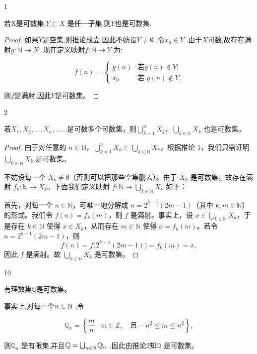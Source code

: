 \begin{mycor*}{1}

若X是可数集,\(Y \subset X\) 是任一子集,则$Y$也是可数集.

\end{mycor*}

\begin{proof}

如果$Y$是空集,则推论成立.因此不妨设\(Y \neq \emptyset\) .令\(x_0 \in Y\) .由于$X$可数,故存在满射\(g: \mathbb{N} \rightarrow X\) .现在定义映射\(f: \mathbb{N} \rightarrow Y\) 为:

\[
f(n) = 
	\begin{cases} 
	g(n) & \text{若}g(n) \in Y; \\ 
	x_0 \quad &\text{若 }g(n) \notin Y. 
	\end{cases}
\]

则$f$是满射,因此$Y$是可数集。

\end{proof}

\begin{mycor*}{2}

若$X_1 ,X_2 , \ldots,X_n , \ldots\ldots$是可数多个可数集，则\(\bigcup_{k=1}^n X_k\)，\(\bigcup_{k\in\mathbb{N}} X_k\) 也是可数集。

\end{mycor*}

\begin{proof}
	由于对任意的 \(n \in \mathbb{N}\)，\(\bigcup_{k=1}^{n} X_{k} \subset \bigcup_{k \in \mathbb{N}} X_{k}\)，根据推论 1，我们只需证明 \(\bigcup_{k \in \mathbb{N}} X_k\) 是可数集。
	
	不妨设每一个 \(X_k \neq \emptyset\)（否则可以把那些空集删去）。由于 \(X_k\) 是可数集，故存在满射 \(f_k: \mathbb{N} \to X_k\)。下面我们定义映射 \(f: \mathbb{N} \to \bigcup_{k \in \mathbb{N}} X_k\) 如下：
	
	首先，对每一个 \(n \in \mathbb{N}\)，可唯一地分解成 \(n = 2^{k-1}(2m-1)\)（其中 \(k, m \in \mathbb{N}\)）的形式。我们令 \(f(n) = f_k(m)\)，则 \(f\) 是满射。事实上，设 \(x \in \bigcup_{k \in \mathbb{N}} X_k\)，于是存在 \(k \in \mathbb{N}\) 使得 \(x \in X_k\)，从而存在 \(m \in \mathbb{N}\) 使得 \(x = f_k(m)\)。若令 \(n = 2^{k-1}(2m-1)\)，则
	\[
	f(n) = f\bigl(2^{k-1}(2m-1)\bigr) = f_k(m) = x,
	\]
	因此 \(f\) 是满射。故 \(\bigcup_{k \in \mathbb{N}} X_k\) 是可数集。
\end{proof}

\begin{sourceexample}{10}

有理数集$\mathbb{Q}$是可数集。

事实上,对每一个\(n \in \mathbb{N}\) ,令

\[\mathbb{Q}_n = \left\{ \frac{m}{n} \mid m \in \mathbb{Z}, \quad \text{且} - n^2 \leqslant m \leqslant n^2 \right\},\]

则\(\mathbb{Q}_n\) 是有限集,并且\(\mathbb{Q} = \bigcup_{n\in\mathbb{N}} \mathbb{Q}_n\) ,因此由推论2知\(\mathbb{Q}\) 是可数集。

\end{sourceexample}



